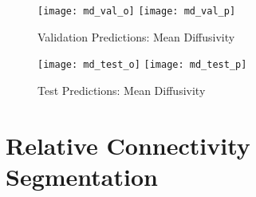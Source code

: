 \begin{figure}[H]
\centering
\texttt{[image: md\_val\_o]}
\texttt{[image: md\_val\_p]}
\caption{Validation Predictions: Mean Diffusivity}
\label{fig:pred-val-md}
\end{figure}

\begin{figure}[H]
\centering
\texttt{[image: md\_test\_o]}
\texttt{[image: md\_test\_p]}
\caption{Test Predictions: Mean Diffusivity}
\label{fig:pred-tes-md}
\end{figure}

\section{Relative Connectivity Segmentation}


